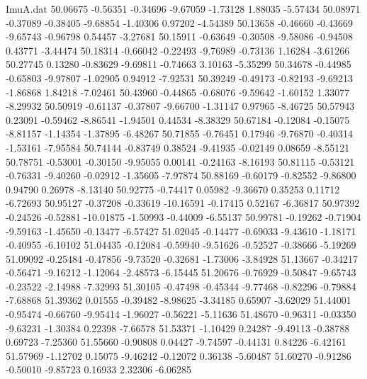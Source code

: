 \begin{filecontents}{ImuA.dat}
  50.06675   -0.56351   -0.34696   -9.67059   -1.73128    1.88035   -5.57434
  50.08971   -0.37089   -0.38405   -9.68854   -1.40306    0.97202   -4.54389
  50.13658   -0.46660   -0.43669   -9.65743   -0.96798    0.54457   -3.27681
  50.15911   -0.63649   -0.30508   -9.58086   -0.94508    0.43771   -3.44474
  50.18314   -0.66042   -0.22493   -9.76989   -0.73136    1.16284   -3.61266
  50.27745    0.13280   -0.83629   -9.69811   -0.74663    3.10163   -5.35299
  50.34678   -0.44985   -0.65803   -9.97807   -1.02905    0.94912   -7.92531
  50.39249   -0.49173   -0.82193   -9.69213   -1.86868    1.84218   -7.02461
  50.43960   -0.44865   -0.68076   -9.59642   -1.60152    1.33077   -8.29932
  50.50919   -0.61137   -0.37807   -9.66700   -1.31147    0.97965   -8.46725
  50.57943    0.23091   -0.59462   -8.86541   -1.94501    0.44534   -8.38329
  50.67184   -0.12084   -0.15075   -8.81157   -1.14354   -1.37895   -6.48267
  50.71855   -0.76451    0.17946   -9.76870   -0.40314   -1.53161   -7.95584
  50.74144   -0.83749    0.38524   -9.41935   -0.02149    0.08659   -8.55121
  50.78751   -0.53001   -0.30150   -9.95055    0.00141   -0.24163   -8.16193
  50.81115   -0.53121   -0.76331   -9.40260   -0.02912   -1.35605   -7.97874
  50.88169   -0.60179   -0.82552   -9.86800    0.94790    0.26978   -8.13140
  50.92775   -0.74417    0.05982   -9.36670    0.35253    0.11712   -6.72693
  50.95127   -0.37208   -0.33619  -10.16591   -0.17415    0.52167   -6.36817
  50.97392   -0.24526   -0.52881  -10.01875   -1.50993   -0.44009   -6.55137
  50.99781   -0.19262   -0.71904   -9.59163   -1.45650   -0.13477   -6.57427
  51.02045   -0.14477   -0.69033   -9.43610   -1.18171   -0.40955   -6.10102
  51.04435   -0.12084   -0.59940   -9.51626   -0.52527   -0.38666   -5.19269
  51.09092   -0.25484   -0.47856   -9.73520   -0.32681   -1.73006   -3.84928
  51.13667   -0.34217   -0.56471   -9.16212   -1.12064   -2.48573   -6.15445
  51.20676   -0.76929   -0.50847   -9.65743   -0.23522   -2.14988   -7.32993
  51.30105   -0.47498   -0.45344   -9.77468   -0.82296   -0.79884   -7.68868
  51.39362    0.01555   -0.39482   -8.98625   -3.34185    0.65907   -3.62029
  51.44001   -0.95474   -0.66760   -9.95414   -1.96027   -0.56221   -5.11636
  51.48670   -0.96311   -0.03350   -9.63231   -1.30384    0.22398   -7.66578
  51.53371   -1.10429    0.24287   -9.49113   -0.38788    0.69723   -7.25360
  51.55660   -0.90808    0.04427   -9.74597   -0.44131    0.84226   -6.42161
  51.57969   -1.12702    0.15075   -9.46242   -0.12072    0.36138   -5.60487
  51.60270   -0.91286   -0.50010   -9.85723    0.16933    2.32306   -6.06285

\end{filecontents}

